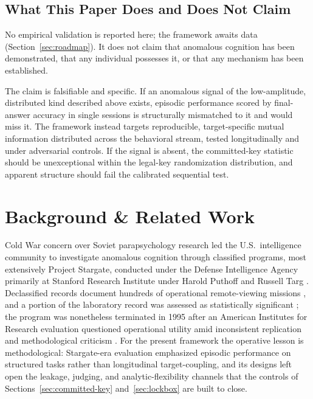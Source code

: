\documentclass[11pt,letterpaper]{article}
\begin{document}
\subsection{What This Paper Does and Does Not Claim}

No empirical validation is reported here; the framework awaits data (Section~\ref{sec:roadmap}). It does not claim that anomalous cognition has been demonstrated, that any individual possesses it, or that any mechanism has been established.

The claim is falsifiable and specific. If an anomalous signal of the low-amplitude, distributed kind described above exists, episodic performance scored by final-answer accuracy in single sessions is structurally mismatched to it and would miss it. The framework instead targets reproducible, target-specific mutual information distributed across the behavioral stream, tested longitudinally and under adversarial controls. If the signal is absent, the committed-key statistic should be unexceptional within the legal-key randomization distribution, and apparent structure should fail the calibrated sequential test.

\section{Background \& Related Work}

Cold War concern over Soviet parapsychology research led the U.S.\ intelligence community to investigate anomalous cognition through classified programs, most extensively Project Stargate, conducted under the Defense Intelligence Agency primarily at Stanford Research Institute under Harold Puthoff and Russell Targ \cite{puthoff1976,targ1977}. Declassified records document hundreds of operational remote-viewing missions \cite{mcmoneagle1997,smith2005}, and a portion of the laboratory record was assessed as statistically significant \cite{utts1996}; the program was nonetheless terminated in 1995 after an American Institutes for Research evaluation questioned operational utility amid inconsistent replication and methodological criticism \cite{air1995}. For the present framework the operative lesson is methodological: Stargate-era evaluation emphasized episodic performance on structured tasks rather than longitudinal target-coupling, and its designs left open the leakage, judging, and analytic-flexibility channels that the controls of Sections~\ref{sec:committed-key} and~\ref{sec:lockbox} are built to close.
\end{document}
